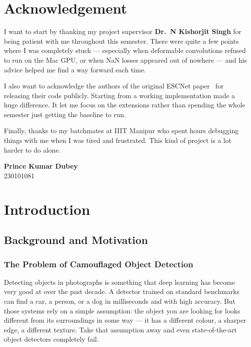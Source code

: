 \documentclass[12pt,a4paper]{report}
\begin{document}
\chapter*{Acknowledgement}

I want to start by thanking my project supervisor \textbf{Dr.\ N Kishorjit Singh} for being patient with me throughout this semester. There were quite a few points where I was completely stuck — especially when deformable convolutions refused to run on the Mac GPU, or when NaN losses appeared out of nowhere — and his advice helped me find a way forward each time.

I also want to acknowledge the authors of the original ESCNet paper~\cite{ye2025escnet} for releasing their code publicly. Starting from a working implementation made a huge difference. It let me focus on the extensions rather than spending the whole semester just getting the baseline to run.

Finally, thanks to my batchmates at IIIT Manipur who spent hours debugging things with me when I was tired and frustrated. This kind of project is a lot harder to do alone.

\vspace{2cm}
\noindent\textbf{Prince Kumar Dubey}\\
230101081
\clearpage

\tableofcontents\clearpage
\listoffigures\clearpage
\listoftables\clearpage

\chapter{Introduction}

\section{Background and Motivation}

\subsection*{The Problem of Camouflaged Object Detection}

Detecting objects in photographs is something that deep learning has become very good at over the past decade. A detector trained on standard benchmarks can find a car, a person, or a dog in milliseconds and with high accuracy. But those systems rely on a simple assumption: the object you are looking for looks different from its surroundings in some way — it has a different colour, a sharper edge, a different texture. Take that assumption away and even state-of-the-art object detectors completely fail.
\end{document}

